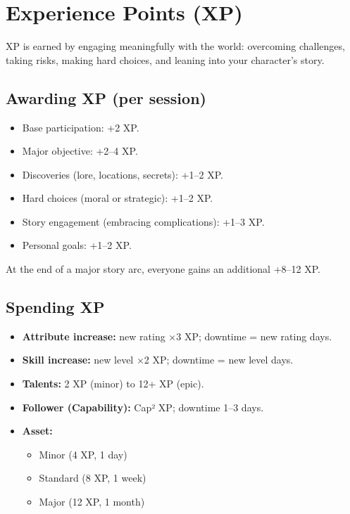 \section{Experience Points (XP)}\label{sec:xp}

XP is earned by engaging meaningfully with the world: overcoming challenges,
taking risks, making hard choices, and leaning into your character's story.

\subsection{Awarding XP (per session)}
\begin{itemize}
    \item Base participation: +2 XP.
    \item Major objective: +2--4 XP.
    \item Discoveries (lore, locations, secrets): +1--2 XP.
    \item Hard choices (moral or strategic): +1--2 XP.
    \item Story engagement (embracing complications): +1--3 XP.
    \item Personal goals: +1--2 XP.
\end{itemize}
At the end of a major story arc, everyone gains an additional +8--12 XP.

\subsection{Spending XP}
\begin{itemize}
    \item \textbf{Attribute increase:} new rating ×3 XP; downtime = new rating days.
    \item \textbf{Skill increase:} new level ×2 XP; downtime = new level days.
    \item \textbf{Talents:} 2 XP (minor) to 12+ XP (epic).
    \item \textbf{Follower (Capability):} Cap² XP; downtime 1--3 days.
    \item \textbf{Asset:}
        \begin{itemize}
            \item Minor (4 XP, 1 day)
            \item Standard (8 XP, 1 week)
            \item Major (12 XP, 1 month)
        \end{itemize}
\end{itemize}

